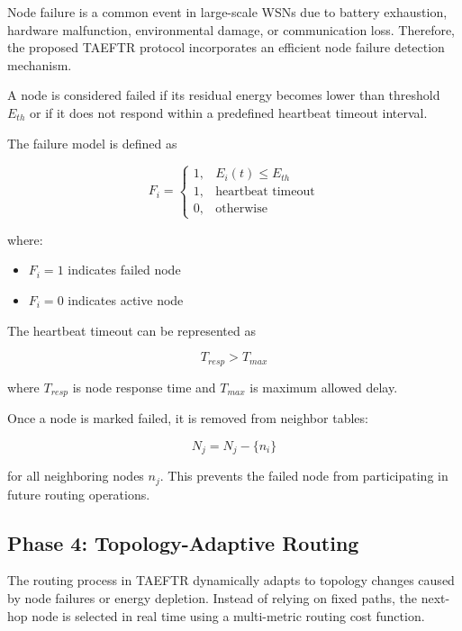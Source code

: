 \documentclass[a4paper,fleqn]{cas-dc}
\numberwithin{equation}{section}
\begin{document}
Node failure is a common event in large-scale WSNs due to battery exhaustion, hardware malfunction, environmental damage, or communication loss. Therefore, the proposed TAEFTR protocol incorporates an efficient node failure detection mechanism.

A node is considered failed if its residual energy becomes lower than threshold $E_{th}$ or if it does not respond within a predefined heartbeat timeout interval.

The failure model is defined as

\begin{equation}
\label{eq:failure_proposed}
F_i=
\begin{cases}
1, & E_i(t)\leq E_{th} \\
1, & \text{heartbeat timeout} \\
0, & \text{otherwise}
\end{cases}
\end{equation}

where:

\begin{itemize}
\item $F_i=1$ indicates failed node
\item $F_i=0$ indicates active node
\end{itemize}

The heartbeat timeout can be represented as

\begin{equation}
T_{resp}>T_{max}
\end{equation}

where $T_{resp}$ is node response time and $T_{max}$ is maximum allowed delay.

Once a node is marked failed, it is removed from neighbor tables:

\begin{equation}
N_j=N_j-\{n_i\}
\end{equation}

for all neighboring nodes $n_j$. This prevents the failed node from participating in future routing operations.

\subsection{Phase 4: Topology-Adaptive Routing}

The routing process in TAEFTR dynamically adapts to topology changes caused by node failures or energy depletion. Instead of relying on fixed paths, the next-hop node is selected in real time using a multi-metric routing cost function.
\end{document}
